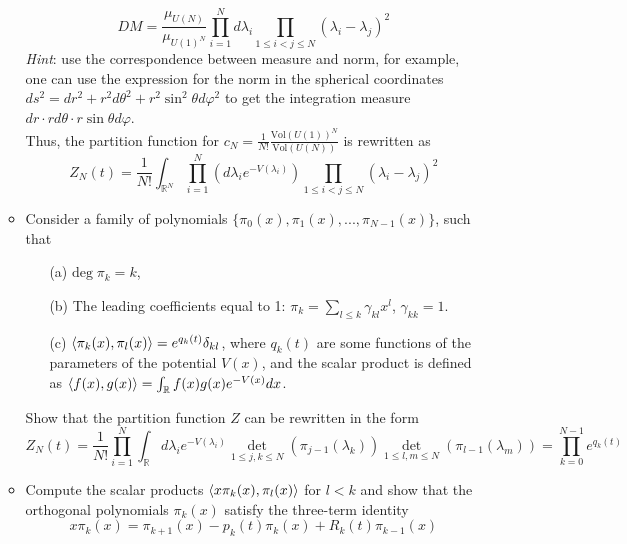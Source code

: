 \documentclass[12pt]{article}
\theoremstyle{definition}
\begin{document}
\begin{enumerate}
\begin{itemize}
        \begin{equation}
            DM=\frac{\mu_{U(N)}}{\mu_{U(1)^N}}\prod\limits_{i=1}^Nd\lambda_i\prod\limits_{1\leq i<j\leq N}(\lambda_i-\lambda_j)^2
        \end{equation}
        \textit{Hint}: use the correspondence between measure and norm, for example, one can use the expression for the norm in the spherical coordinates $ds^2 = dr^2 + r^2d\theta^2 + r^2\sin^2\theta d\varphi^2$ to get the integration measure $dr\cdot rd\theta\cdot r\sin\theta d\varphi$.\\
        Thus, the partition function for $c_N=\frac{1}{N!}\frac{\text{Vol}(U(1))^N}{\text{Vol}(U(N))}$ is rewritten as
        \begin{equation}
            Z_N(t)=\frac{1}{N!}\int_{\mathbb{R}^N}\prod\limits_{i=1}^N(d\lambda_ie^{-V(\lambda_i)})\prod\limits_{1\leq i<j\leq N}(\lambda_i-\lambda_j)^2
        \end{equation}
        \item Consider a family of polynomials $\{\pi_0(x),\pi_1(x),...,\pi_{N-1}(x)\}$, such that
        \begin{itemize}
            \item[(a)] $\text{deg}\;\pi_k=k$,
            \item[(b)] The leading coefficients equal to 1: $\pi_k=\sum\limits_{l\leq k}\gamma_{kl}x^l$, $\gamma_{kk}=1$.
            \item[(c)] $\braket{\pi_k(x),\pi_l(x)}=e^{q_k(t)}\delta_{kl}$, where $q_k(t)$ are some functions of the parameters of the potential $V(x)$, and the scalar product is defined as $\braket{f(x),g(x)}=\int_{\mathbb{R}}f(x)g(x)e^{-V(x)}dx$.
        \end{itemize}
        Show that the partition function $Z$ can be rewritten in the form
        \begin{equation}
            Z_N(t)=\frac{1}{N!}\prod\limits_{i=1}^N\int_{\mathbb{R}}d\lambda_ie^{-V(\lambda_i)}\underset{1\leq j,k\leq N}{\det}(\pi_{j-1}(\lambda_k))\underset{1\leq l,m\leq N}{\det}(\pi_{l-1}(\lambda_m))=\prod\limits_{k=0}^{N-1}e^{q_k(t)}
        \end{equation}
        \item Compute the scalar products $\braket{x\pi_k(x),\pi_l(x)}$ for $l<k$ and show that the orthogonal polynomials $\pi_k(x)$ satisfy the three-term identity
        \begin{equation}
            x\pi_k(x)=\pi_{k+1}(x)-p_k(t)\pi_k(x)+R_k(t)\pi_{k-1}(x)
        \end{equation}

\end{itemize}
\end{enumerate}
\end{document}
